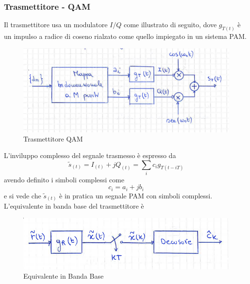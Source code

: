         \subsubsection{Trasmettitore - QAM}
            Il trasmettitore usa un modulatore $I/Q$ come illustrato di seguito, dove $g_{T(t)}$ è un impulso a radice di coseno rialzato 
            come quello impiegato in un sistema PAM.
            \begin{figure}[H]
                \centering
                \includegraphics[width = 12cm]{media/trasmettitore qam.png}
                \caption{Trasmettitore QAM}
            \end{figure}
            L'inviluppo complesso del segnale trasmesso è espresso da
            \[
                \tilde{s}_{(t)} = I_{(t)} +jQ_{(t)} = \sum_{i}c_ig_{T(t-iT)}
            \]
            avendo definito i simboli complessi come 
            \[
                c_i = a_i+jb_i    
            \]
            e si vede che $\tilde{s}_{(t)}$ è in pratica un segnale PAM con simboli complessi. L'equivalente in banda base del trasmettitore è 
            \begin{figure}[H]
                \centering
                \includegraphics[width = 12cm]{media/equivalente ricevitore in banda base.png}
                \caption{Equivalente in Banda Base}
            \end{figure}
